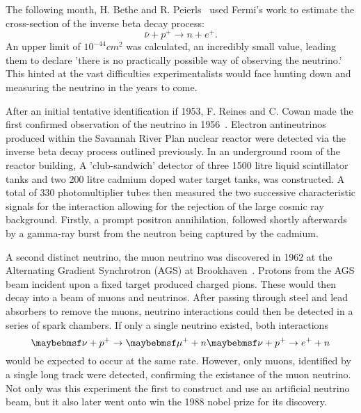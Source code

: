 The following month, H. Bethe and R. Peierls~\cite{bethe1934} used Fermi's work to estimate the
cross-section of the inverse beta decay process:
\begin{equation} %
    \bar{\nu} + p^{+} \rightarrow n + e^{+}.
\end{equation} %
An upper limit of $10^{-44} cm^2$ was calculated, an incredibly small value, leading them to
declare 'there is no practically possible way of observing the neutrino.' This hinted at the vast
difficulties experimentalists would face hunting down and measuring the neutrino in the years to
come.

After an initial tentative identification if 1953, F. Reines and C. Cowan made the first confirmed
observation of the neutrino in 1956~\cite{cowan1956}. Electron antineutrinos produced within the
Savannah River Plan nuclear reactor were detected via the inverse beta decay process outlined
previously. In an underground room of the reactor building, A 'club-sandwich' detector of three
1500 litre liquid scintillator tanks and two 200 litre cadmium doped water target tanks, was
constructed. A total of 330 photomultiplier tubes then measured the two successive characteristic
signals for the interaction allowing for the rejection of the large cosmic ray background.
Firstly, a prompt positron annihilation, followed shortly afterwards by a gamma-ray burst from the
neutron being captured by the cadmium.

A second distinct neutrino, the muon neutrino was discovered in 1962 at the Alternating Gradient
Synchrotron (AGS) at Brookhaven~\cite{danby1962}. Protons from the AGS beam incident upon a fixed
target produced charged pions. These would then decay into a beam of muons and neutrinos. After
passing through steel and lead absorbers to remove the muons, neutrino interactions could then be
detected in a series of spark chambers. If only a single neutrino existed, both interactions
\begin{equation} %
    \nu+p^{+}\rightarrow\mu^{+}+n \\
    \nu+p^{+}\rightarrow e^{+}+n
\end{equation} %
would be expected to occur at the same rate.
However, only muons, identified by a single long track were detected, confirming the existance of
the muon neutrino. Not only was this experiment the first to construct and use an artificial
neutrino beam, but it also later went onto win the 1988 nobel prize for its discovery.

